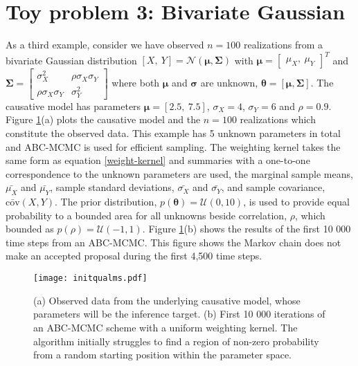 \section{Toy problem 3: Bivariate Gaussian}
As a third example, consider we have observed $n = 100$ realizations from a bivariate Gaussian distribution $[X,\ Y] = \mathcal{N}(\bm{\mu},\bm{\Sigma})$ with $\bm{\mu} = \begin{bmatrix}
\mu_X,\ \mu_Y
\end{bmatrix}^T$ and $\bm{\Sigma} = \begin{bmatrix}
\sigma^2_X & \rho\sigma_X\sigma_Y\\
\rho\sigma_X\sigma_Y & \sigma^2_Y
\end{bmatrix} $ where both $\bm{\mu}$ and $\bm{\sigma}$ are unknown, $\bm{\theta} = [\bm{\mu},\bm{\Sigma}]$. The causative model has parameters $\bm{\mu} = [2.5,\ 7.5]$, $\sigma_X = 4$, $\sigma_Y = 6$ and $\rho = 0.9$. Figure \ref{init-qualms}(a) plots the causative model and the $n = 100$ realizations which constitute the observed data. This example has 5 unknown parameters in total and ABC-MCMC is used for efficient sampling. The weighting kernel takes the same form as equation \ref{weight-kernel} and summaries with a one-to-one correspondence to the unknown parameters are used, the marginal sample means, $\bar{\mu_X}$ and $\bar{\mu_Y}$, sample standard deviations, $\bar{\sigma_X}$ and $\bar{\sigma_Y}$, and sample covariance, $\bar{\text{cov}}(X,Y)$. The prior distribution, $p(\bm{\theta}) = \mathcal{U}(0,10)$, is used to provide equal probability to a bounded area for all unknowns beside correlation, $\rho$, which bounded as $p(\rho) = \mathcal{U}(-1,1)$. Figure \ref{init-qualms}(b) shows the results of the first 10 000 time steps from an ABC-MCMC. This figure shows the Markov chain does not make an accepted proposal during the first 4,500 time steps.
\begin{figure}[H]
	\centering
	\texttt{[image: initqualms.pdf]}
	\caption{(a) Observed data from the underlying causative model, whose parameters will be the inference target. (b) First 10 000 iterations of an ABC-MCMC scheme with a uniform weighting kernel. The algorithm initially struggles to find a region of non-zero probability from a random starting position within the parameter space.}
	\label{init-qualms}
\end{figure}

